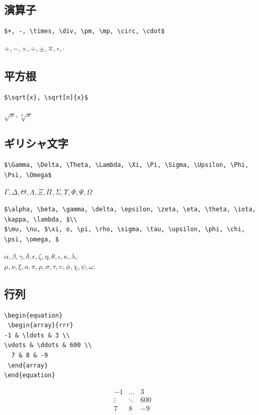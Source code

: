 \documentclass[a4j]{jsarticle}
\begin{document}
\subsection{演算子}
\begin{verbatim}
$+, -, \times, \div, \pm, \mp, \circ, \cdot$
\end{verbatim}
$+, -, \times, \div, \pm, \mp, \circ, \cdot$

\subsection{平方根}
\begin{verbatim}
$\sqrt{x}, \sqrt[n]{x}$
\end{verbatim}
$\sqrt{x}, \sqrt[n]{x}$

\subsection{ギリシャ文字}
\begin{verbatim}
$\Gamma, \Delta, \Theta, \Lambda, \Xi, \Pi, \Sigma, \Upsilon, \Phi, \Psi, \Omega$
\end{verbatim}
$\Gamma, \Delta, \Theta, \Lambda, \Xi, \Pi, \Sigma, \Upsilon, \Phi, \Psi, \Omega$

\begin{verbatim}
$\alpha, \beta, \gamma, \delta, \epsilon, \zeta, \eta, \theta, \iota, \kappa, \lambda, $\\
$\mu, \nu, $\xi, o, \pi, \rho, \sigma, \tau, \upsilon, \phi, \chi, \psi, \omega, $
\end{verbatim}
$\alpha, \beta, \gamma, \delta, \epsilon, \zeta, \eta, \theta, \iota, \kappa, \lambda, $\\
$\mu, \nu, \xi, o, \pi, \rho, \sigma, \tau, \upsilon, \phi, \chi, \psi, \omega, $
\subsection{行列}
\begin{verbatim}
\begin{equation}
 \begin{array}{rrr}
-1 & \ldots & 3 \\
\vdots & \ddots & 600 \\
  7 & 8 & -9
 \end{array}
\end{equation}
\end{verbatim}

\begin{equation}
\begin{array}{rrr}
-1 & \ldots & 3 \\
\vdots & \ddots & 600 \\
7 & 8 & -9
\end{array}
\end{equation}
\end{document}
